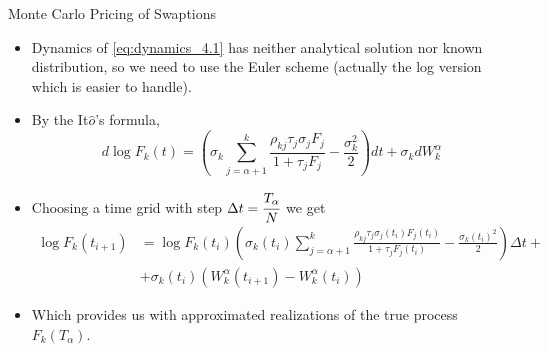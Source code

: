 \documentclass{beamer}
\begin{document}
\begin{frame}{Monte Carlo Pricing of Swaptions}
  \begin{itemize}
  \item<1-> Dynamics of \cref{eq:dynamics_4.1} has neither analytical solution nor known distribution, so we need to use the Euler scheme (actually the log version which is easier to handle).
  \item<2-> By the It$\hat{o}$’s formula,
    \begin{equation*}
      d\log F_k(t) = \left(\sigma_k\sum_{j=\alpha+1}^k\frac{\rho_{kj}\tau_j\sigma_jF_j}{1+\tau_jF_j}-\frac{\sigma_k^2}{2}\right)dt+\sigma_k dW^\alpha_k
    \end{equation*}
  \item<3-> Choosing a time grid with step $\Delta t = \cfrac{T_\alpha}{N}$ we get
    \begin{equation*}
      \begin{aligned}
        \log F_k(t_{i+1}) &=\log F_k(t_i) \left(\sigma_k(t_i)\sum_{j=\alpha+1}^k\frac{\rho_{kj}\tau_j\sigma_j(t_i)F_j(t_i)}{1+\tau_jF_j(t_i)}-\frac{\sigma_k(t_i)^2}{2}\right)\Delta t + \\
        &+\sigma_k(t_i) (W^\alpha_k(t_{i+1}) - W^\alpha_k(t_i))
      \end{aligned}
    \end{equation*}
  \item<4-> Which provides us with approximated realizations of the true process $F_k(T_\alpha)$.
  \end{itemize}
\end{frame}

\end{document}
